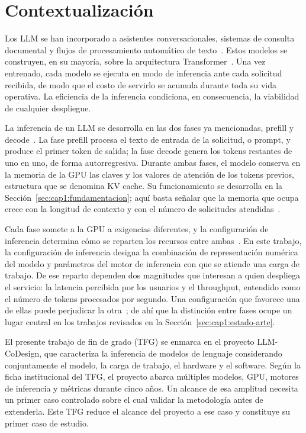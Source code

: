 \section{Contextualización}
\label{sec:cap1:contexto}

Los LLM se han incorporado a asistentes conversacionales, sistemas de consulta documental y flujos de procesamiento automático de texto~\cite{zhao2023survey}.
Estos modelos se construyen, en su mayoría, sobre la arquitectura Transformer~\cite{vaswani2017attention}. Una vez entrenado, cada modelo se ejecuta en modo de inferencia ante cada solicitud recibida, de modo que el costo de servirlo se acumula durante toda su vida operativa. La eficiencia de la inferencia condiciona, en consecuencia, la viabilidad de cualquier despliegue.

La inferencia de un LLM se desarrolla en las dos fases ya mencionadas, prefill y decode~\cite{zhong2024distserve}. La fase prefill procesa el texto de entrada de la solicitud, o prompt, y produce el primer token de salida; la fase decode genera los tokens restantes de uno en uno, de forma autorregresiva. Durante ambas fases, el modelo conserva en la memoria de la GPU las claves y los valores de atención de los tokens previos, estructura que se denomina KV cache. Su funcionamiento se desarrolla en la Sección~\ref{sec:cap1:fundamentacion}; aquí basta señalar que la memoria que ocupa crece con la longitud de contexto y con el número de solicitudes atendidas~\cite{kwon2023pagedattention}.

Cada fase somete a la GPU a exigencias diferentes, y la configuración de inferencia determina cómo se reparten los recursos entre ambas~\cite{agrawal2024sarathi,zhong2024distserve}. En este trabajo, la configuración de inferencia designa la combinación de representación numérica del modelo y parámetros del motor de inferencia con que se atiende una carga de trabajo. De ese reparto dependen dos magnitudes que interesan a quien despliega el servicio: la latencia percibida por los usuarios y el throughput, entendido como el número de tokens procesados por segundo. Una configuración que favorece una de ellas puede perjudicar la otra~\cite{agrawal2024sarathi}; de ahí que la distinción entre fases ocupe un lugar central en los trabajos revisados en la Sección~\ref{sec:cap1:estado-arte}.

El presente trabajo de fin de grado (TFG) se enmarca en el proyecto LLM-CoDesign, que caracteriza la inferencia de modelos de lenguaje considerando conjuntamente el modelo, la carga de trabajo, el hardware y el software. Según la ficha institucional del TFG, el proyecto abarca múltiples modelos, GPU, motores de inferencia y métricas durante cinco años. Un alcance de esa amplitud necesita un primer caso controlado sobre el cual validar la metodología antes de extenderla. Este TFG reduce el alcance del proyecto a ese caso y constituye su primer caso de estudio.

